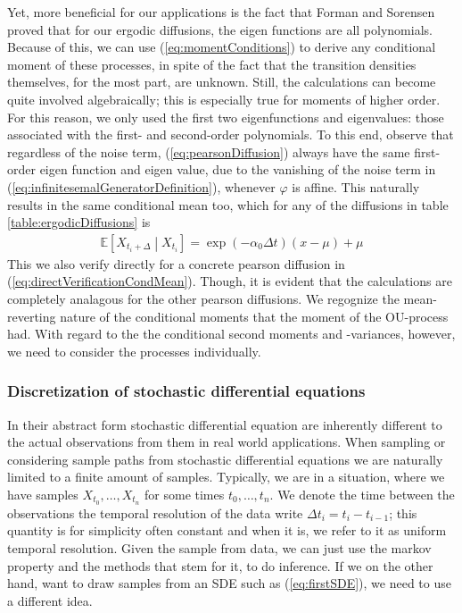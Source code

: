 Yet, more beneficial for our applications is the fact that Forman and Sorensen \cite{FormanSorensen2008} proved that for our ergodic diffusions, the eigen functions are all polynomials. Because of this, we can use (\ref{eq:momentConditions}) to derive any conditional moment of these processes, in spite of the fact that the transition densities themselves, for the most part, are unknown. Still, the calculations can become quite involved algebraically; this is especially true for moments of higher order. For this reason, we only used the first two eigenfunctions and eigenvalues: those associated with the first- and second-order polynomials. To this end, observe that regardless of the noise term, (\ref{eq:pearsonDiffusion}) always have the same first-order eigen function and eigen value, due to the vanishing of the noise term in (\ref{eq:infinitesemalGeneratorDefinition}), whenever $\varphi$ is affine. This naturally results in the same conditional mean too, which for any of the diffusions in table \ref{table:ergodicDiffusions} is
\begin{align}
    \mathbb{E}\left[X_{t_{i}+\Delta} \middle|X_{t_{i}} \right] = \exp\left(-\alpha_0\Delta t\right)\left(x-\mu\right) + \mu
\end{align}
This we also verify directly for a concrete pearson diffusion in (\ref{eq:directVerificationCondMean}). Though, it is evident that the calculations are completely analagous for the other pearson diffusions. We regognize the mean-reverting nature of the conditional moments that the moment of the OU-process had. With regard to the the conditional second moments and -variances, however, we need to consider the processes individually.
\subsubsection{Discretization of stochastic differential equations}
In their abstract form stochastic differential equation are inherently different to the actual observations from them in real world applications.
When sampling or considering sample paths from stochastic differential equations we are naturally limited to a finite amount of samples. Typically, we are in a situation, where we have samples $X_{t_0},\dots,X_{t_n}$ for some times $t_0,\dots,t_n$. We denote the time between the observations the temporal resolution of the data write $\Delta t_i = t_{i} - t_{i - 1}$; this quantity is for simplicity often constant and when it is, we refer to it as uniform temporal resolution. Given the sample from data, we can just use the markov property and the methods that stem for it, to do inference. If we on the other hand, want to draw samples from an SDE such as  (\ref{eq:firstSDE}), we need to use a different idea. 
